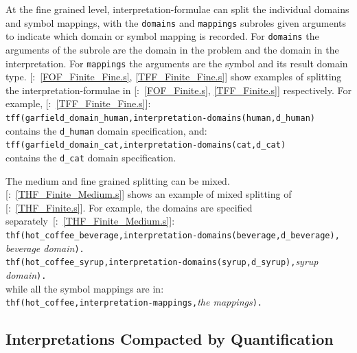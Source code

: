 \documentclass{easychair}
\newcommand{\smalltt}[1]{\small \texttt{#1}}
\newcommand{\example}{{\scriptsize \faFile[regular]}}
\begin{document}
At the fine grained level, interpretation-formulae can split the individual domains and symbol 
mappings, with the \smalltt{domains} and \smalltt{mappings} subroles given arguments to indicate
which domain or symbol mapping is recorded.
For \smalltt{domains} the arguments of the subrole are the domain in the problem and the domain 
in the interpretation.
For \smalltt{mappings} the arguments are the symbol and its result domain type.
[\example{}:~\ref{FOF_Finite_Fine.s}, \ref{TFF_Finite_Fine.s}] show 
examples of splitting the interpretation-formulae in
[\example{}:~\ref{FOF_Finite.s}, \ref{TFF_Finite.s}] respectively.
For example, [\example{}:~\ref{TFF_Finite_Fine.s}]:\\
\hspace*{0.5cm}\smalltt{tff(garfield\_domain\_human,interpretation-domains(human,d\_human)} \\
contains the \smalltt{d\_human} domain specification, and: \\
\hspace*{0.5cm}\smalltt{tff(garfield\_domain\_cat,interpretation-domains(cat,d\_cat)} \\
contains the \smalltt{d\_cat} domain specification.

The medium and fine grained splitting can be mixed.
[\example{}:~\ref{THF_Finite_Medium.s}] shows an example of mixed 
splitting of [\example{}:~\ref{THF_Finite.s}].
For example, the domains are specified separately~[\example{}:~\ref{THF_Finite_Medium.s}]: \\
\hspace*{0.5cm}\smalltt{thf(hot\_coffee\_beverage,interpretation-domains(beverage,d\_beverage),}\\
\hspace*{0.9cm}\emph{beverage domain}\smalltt{).} \\
\hspace*{0.5cm}\smalltt{thf(hot\_coffee\_syrup,interpretation-domains(syrup,d\_syrup),}\emph{syrup domain}\smalltt{).} \\
while all the symbol mappings are in: \\
\hspace*{0.5cm}\smalltt{thf(hot\_coffee,interpretation-mappings,}\emph{the mappings}\smalltt{).}

\subsection{Interpretations Compacted by Quantification}
\label{NewTarskianCompact}
\end{document}

